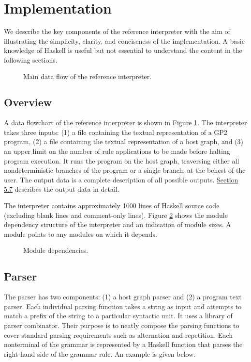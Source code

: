 \section{Implementation}
\label{sec:implementation}
We describe the key components of the reference interpreter with the aim of illustrating the simplicity, clarity, and conciseness of the implementation. A basic knowledge of Haskell is useful but not essential to understand the content in the following sections. 

\begin{figure}
\centering

\caption{Main data flow of the reference interpreter.} \label{fig:architecture}
\end{figure}

\subsection{Overview}
A data flowchart of the reference interpreter is shown in Figure \ref{fig:architecture}. The interpreter takes three inputs: (1) a file containing the textual representation of a GP2 program, (2) a file containing the textual representation of a host graph, and (3) an upper limit on the number of rule applications to be made before halting program execution. It runs the program on the host graph, traversing either all nondeterministic branches of the program or a single branch, at the behest of the user. The output data is a complete description of all possible outputs. \hyperref[sec:eval]{Section 5.7} describes the output data in detail.

The interpreter contains approximately 1000 lines of Haskell source code (excluding blank lines and comment-only lines). Figure \ref{fig:modules} shows the module dependency structure of the interpreter and an indication of module sizes. A module points to any modules on which it depends. 

\begin{figure}
\centering

\caption{Module dependencies.} \label{fig:modules}
\end{figure}

\subsection{Parser}
The parser has two components: (1) a host graph parser and (2) a program text parser. Each individual parsing function takes a string as input and attempts to match a prefix of the string to a particular syntactic unit. It uses a library of parser combinator. Their purpose is to neatly compose the parsing functions to cover standard parsing requirements such as alternation and repetition. Each nonterminal of the grammar is represented by a Haskell function that parses the right-hand side of the grammar rule. An example is given below.

